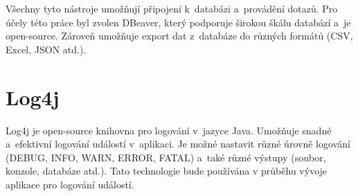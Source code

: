 Všechny tyto nástroje umožňují připojení k~databázi a~provádění dotazů.  
Pro účely této práce byl zvolen DBeaver, který podporuje širokou škálu databází a~je open-source.  
Zároveň umožňuje export dat z~databáze do různých formátů (CSV, Excel, JSON atd.).  
\cite{dbeaver}

\section{Log4j}
Log4j je open-source knihovna pro logování v~jazyce Java.
Umožňuje snadné a~efektivní logování událostí v~aplikaci.
Je možné nastavit různé úrovně logování (DEBUG, INFO, WARN, ERROR, FATAL) a~také různé výstupy 
(soubor, konzole, databáze atd.).
Tato technologie bude používána v průběhu vývoje aplikace pro logování událostí.
\cite{log4j}